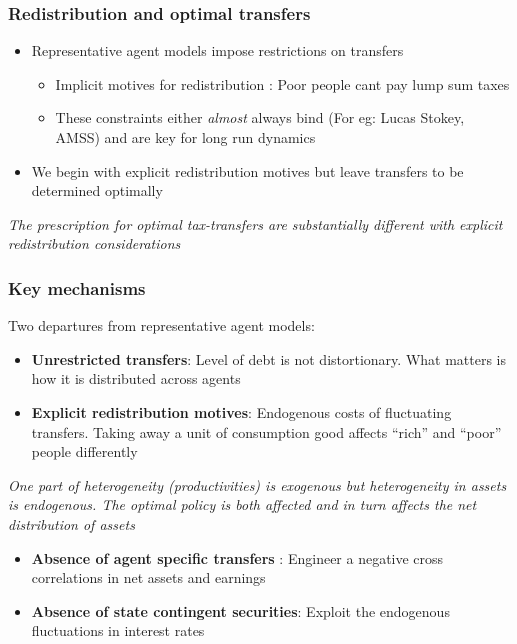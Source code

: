 \documentclass{beamer}
\begin{document}
 \begin{frame}
 \frametitle{Redistribution and optimal transfers}
 \begin{itemize}
  \item Representative agent models impose restrictions on transfers
  \begin{itemize}
 \item Implicit motives for redistribution :  Poor people cant pay lump sum taxes
  \item These constraints either \emph{almost} always bind (For eg: Lucas Stokey, AMSS) and are key for long run dynamics
  \end{itemize}
\item We begin with explicit redistribution motives but leave transfers to be determined optimally
 \end{itemize}

 \vspace{4mm}
 \color{red}\emph{The prescription for optimal tax-transfers are substantially different with explicit redistribution considerations}
 \end{frame}
 



\begin{frame}
\frametitle{Key mechanisms}
Two departures from representative agent models:
\begin{itemize}
\item \textbf{Unrestricted transfers}: Level of debt is not distortionary. What matters is how it is distributed across agents
 \item \textbf{Explicit redistribution motives}: Endogenous costs of fluctuating transfers. Taking away a unit of consumption good affects ``rich'' and ``poor'' people differently
 \end{itemize}

\emph{One part of heterogeneity (productivities) is exogenous but heterogeneity in assets is endogenous. The optimal policy is both affected and in turn affects the net distribution of assets}

 \begin{itemize}
\item \textbf{Absence of agent specific transfers} : Engineer  a negative cross correlations in net assets and earnings
\item \textbf{Absence of state contingent securities}: Exploit the endogenous fluctuations in interest rates
\end{itemize}

\end{frame}
\end{document}
